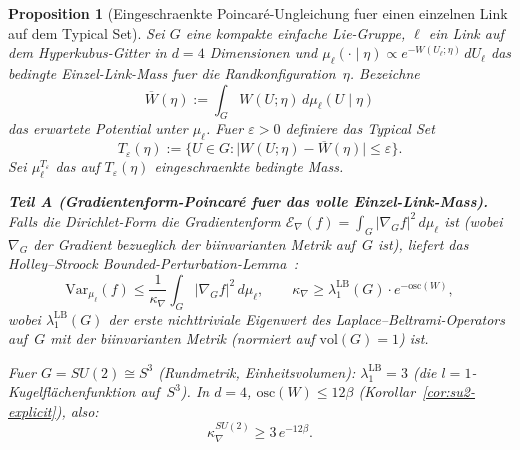 \documentclass[12pt,a4paper]{article}
\theoremstyle{definition}
\theoremstyle{plain}
\newtheorem{proposition}[definition]{Proposition}
\theoremstyle{remark}
\begin{document}
\begin{proposition}[Eingeschraenkte Poincar\'e-Ungleichung fuer einen einzelnen Link auf dem Typical Set]
\label{prop:restricted-poincare}
Sei $G$ eine kompakte einfache Lie-Gruppe, $\ell$ ein Link auf dem Hyperkubus-Gitter in $d = 4$ Dimensionen und $\mu_\ell(\cdot \mid \eta) \propto e^{-W(U_\ell; \eta)}\,dU_\ell$ das bedingte Einzel-Link-Mass fuer die Randkonfiguration~$\eta$. Bezeichne
\[
    \overline{W}(\eta) := \int_G W(U;\eta)\,d\mu_\ell(U \mid \eta)
\]
das erwartete Potential unter $\mu_\ell$. Fuer $\varepsilon > 0$ definiere das \emph{Typical Set}
\begin{equation}\label{eq:typical-set}
    T_\varepsilon(\eta) := \bigl\{U \in G : \bigl|W(U;\eta) - \overline{W}(\eta)\bigr| \leq \varepsilon\bigr\}.
\end{equation}
Sei $\mu_\ell^{T_\varepsilon}$ das auf $T_\varepsilon(\eta)$ eingeschraenkte bedingte Mass.

\medskip
\noindent\textbf{Teil A (Gradientenform-Poincar\'e fuer das volle Einzel-Link-Mass).}
Falls die Dirichlet-Form die Gradientenform $\mathcal{E}_\nabla(f) = \int_G |\nabla_G f|^2\,d\mu_\ell$ ist (wobei $\nabla_G$ der Gradient bezueglich der biinvarianten Metrik auf~$G$ ist), liefert das Holley--Stroock Bounded-Perturbation-Lemma~\cite{HolleyStroock1987}:
\begin{equation}\label{eq:gradient-poincare-link}
    \mathrm{Var}_{\mu_\ell}(f) \leq \frac{1}{\kappa_\nabla}\int_G |\nabla_G f|^2\,d\mu_\ell, \qquad \kappa_\nabla \geq \lambda_1^{\mathrm{LB}}(G)\cdot e^{-\mathrm{osc}(W)},
\end{equation}
wobei $\lambda_1^{\mathrm{LB}}(G)$ der erste nichttriviale Eigenwert des Laplace--Beltrami-Operators auf~$G$ mit der biinvarianten Metrik (normiert auf $\mathrm{vol}(G) = 1$) ist.

Fuer $G = SU(2) \cong S^3$ (Rundmetrik, Einheitsvolumen): $\lambda_1^{\mathrm{LB}} = 3$ (die $l=1$-Kugelfl\"achenfunktion auf~$S^3$). In $d=4$, $\mathrm{osc}(W) \leq 12\beta$ (Korollar~\ref{cor:su2-explicit}), also:
\begin{equation}\label{eq:gradient-poincare-su2}
    \kappa_\nabla^{SU(2)} \geq 3\,e^{-12\beta}.
\end{equation}


\end{proposition}
\end{document}
